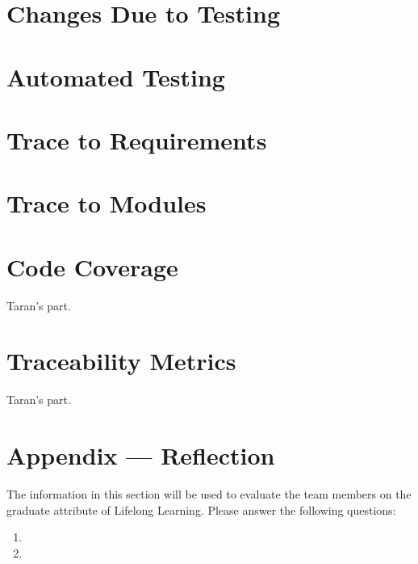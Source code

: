 \documentclass[12pt, titlepage]{article}
\begin{document}
\section{Changes Due to Testing}

\section{Automated Testing}
		
\section{Trace to Requirements}
		
\section{Trace to Modules}		


\section{Code Coverage}

Taran's part.

\section{Traceability Metrics} 

Taran's part.




\newpage{}
\section*{Appendix --- Reflection}

The information in this section will be used to evaluate the team members on the
graduate attribute of Lifelong Learning.  Please answer the following questions:

\begin{enumerate}
  \item 
  \item 
\end{enumerate}
\end{document}
